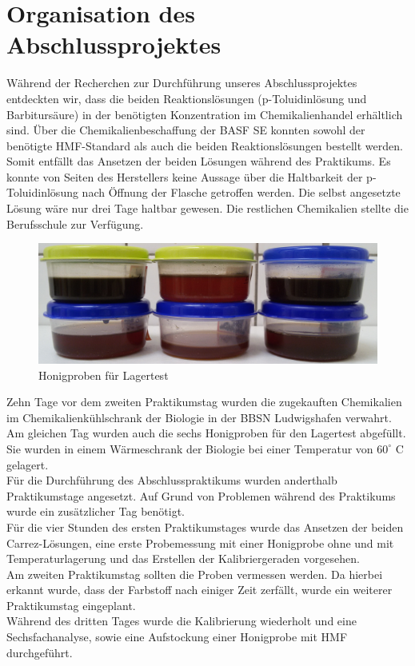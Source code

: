 \section{Organisation des Abschlussprojektes}
Während der Recherchen zur Durchführung unseres Abschlussprojektes entdeckten wir, dass die beiden Reaktionslösungen (p-Toluidinlösung und Barbitursäure) in der benötigten Konzentration im Chemikalienhandel erhältlich sind. Über die Chemikalienbeschaffung der BASF SE konnten sowohl der benötigte HMF-Standard als auch die beiden Reaktionslösungen bestellt werden. Somit entfällt das Ansetzen der beiden Lösungen während des Praktikums. Es konnte von Seiten des Herstellers keine Aussage über die Haltbarkeit der p-Toluidinlösung nach Öffnung der Flasche getroffen werden. Die selbst angesetzte Lösung wäre nur drei Tage haltbar gewesen. Die restlichen Chemikalien stellte die Berufsschule zur Verfügung. \\
\begin{figure}[tbp]
	\centering
		\includegraphics[width=1.00\textwidth]{../Bilder/20150504_141528.jpg}
	\caption{Honigproben für Lagertest}
	\label{fig:Lagertest}
\end{figure}
Zehn Tage vor dem zweiten Praktikumstag wurden die zugekauften Chemikalien im Chemikalienkühlschrank der Biologie in der BBSN Ludwigshafen verwahrt. Am gleichen Tag wurden auch die sechs Honigproben für den Lagertest abgefüllt. Sie wurden in einem Wärmeschrank der Biologie bei einer Temperatur von $60^\circ$ C gelagert.\\
Für die Durchführung des Abschlusspraktikums wurden anderthalb Praktikumstage angesetzt. Auf Grund von Problemen während des Praktikums wurde ein zusätzlicher Tag benötigt. \\
Für die vier Stunden des ersten Praktikumstages wurde das Ansetzen der beiden Carrez-Lösungen, eine erste Probemessung mit einer Honigprobe ohne und mit Temperaturlagerung und das Erstellen der Kalibriergeraden vorgesehen.\\
Am zweiten Praktikumstag sollten die Proben vermessen werden. Da hierbei erkannt wurde, dass der Farbstoff nach einiger Zeit zerfällt, wurde ein weiterer Praktikumstag eingeplant.\\
Während des dritten Tages wurde die Kalibrierung wiederholt und eine Sechsfachanalyse, sowie eine Aufstockung einer Honigprobe mit HMF durchgeführt.\\

